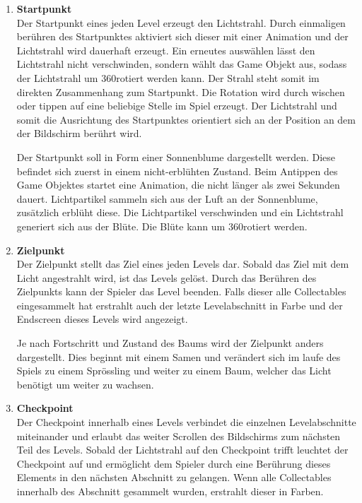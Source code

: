 \begin{enumerate}
\item \textbf{Startpunkt} \hfill \\
Der Startpunkt eines jeden Level erzeugt den Lichtstrahl. Durch einmaligen berühren des Startpunktes aktiviert sich dieser mit einer Animation und der Lichtstrahl wird dauerhaft erzeugt. Ein erneutes auswählen lässt den Lichtstrahl nicht verschwinden, sondern wählt das Game Objekt aus, sodass der Lichtstrahl um 360\degree rotiert werden kann. Der Strahl steht somit im direkten Zusammenhang zum Startpunkt. Die Rotation wird durch wischen oder tippen auf eine beliebige Stelle im Spiel erzeugt. Der Lichtstrahl und somit die Ausrichtung des Startpunktes orientiert sich an der Position an dem der Bildschirm berührt wird.

Der Startpunkt soll in Form einer Sonnenblume dargestellt werden. Diese befindet sich zuerst in einem nicht-erblühten Zustand. Beim Antippen des Game Objektes startet eine Animation, die nicht länger als zwei Sekunden dauert. Lichtpartikel sammeln sich aus der Luft an der Sonnenblume, zusätzlich erblüht diese. Die Lichtpartikel verschwinden und ein Lichtstrahl generiert sich aus der Blüte. Die Blüte kann um 360\degree rotiert werden.

\item \textbf{Zielpunkt} \hfill \\
Der Zielpunkt stellt das Ziel eines jeden Levels dar. 
Sobald das Ziel mit dem Licht angestrahlt wird, ist das Levels gelöst. Durch das Berühren des Zielpunkts kann der Spieler das Level beenden. Falls dieser alle Collectables eingesammelt hat erstrahlt auch der letzte Levelabschnitt in Farbe und der Endscreen dieses Levels wird angezeigt.

Je nach Fortschritt und Zustand des Baums wird der Zielpunkt anders dargestellt. Dies beginnt mit einem Samen und verändert sich im laufe des Spiels zu einem Sprössling und weiter zu einem Baum, welcher das Licht benötigt um weiter zu wachsen.

\item \textbf{Checkpoint} \hfill \\
Der Checkpoint innerhalb eines Levels verbindet die einzelnen Levelabschnitte miteinander und erlaubt das weiter Scrollen des Bildschirms zum nächsten Teil des Levels.
Sobald der Lichtstrahl auf den Checkpoint trifft leuchtet der Checkpoint auf und ermöglicht dem Spieler durch eine Berührung dieses Elements in den nächsten Abschnitt zu gelangen. Wenn alle Collectables innerhalb des Abschnitt gesammelt wurden, erstrahlt dieser in Farben. 


\end{enumerate}
